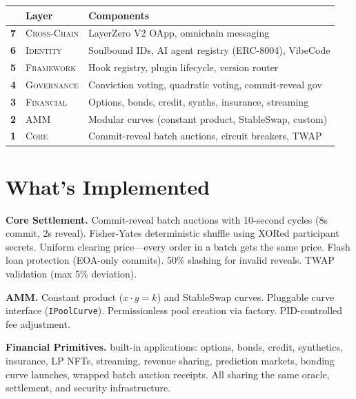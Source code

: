 \documentclass[10pt, letterpaper]{article}
\newcommand{\sub}[1]{\textbf{#1}\enspace}
\begin{document}
\vspace{0.2em}
\begin{center}
\small
\renewcommand{\arraystretch}{1.15}
\begin{tabular}{@{} c @{\;\;} l @{\;\;} l @{}}
\toprule
& \textbf{Layer} & \textbf{Components} \\
\midrule
\textsf{\textbf{7}} & \textsc{Cross-Chain} & LayerZero V2 OApp, omnichain messaging \\
\textsf{\textbf{6}} & \textsc{Identity} & Soulbound IDs, AI agent registry (ERC-8004), VibeCode \\
\textsf{\textbf{5}} & \textsc{Framework} & Hook registry, plugin lifecycle, version router \\
\textsf{\textbf{4}} & \textsc{Governance} & Conviction voting, quadratic voting, commit-reveal gov \\
\textsf{\textbf{3}} & \textsc{Financial} & Options, bonds, credit, synths, insurance, streaming \\
\textsf{\textbf{2}} & \textsc{AMM} & Modular curves (constant product, StableSwap, custom) \\
\textsf{\textbf{1}} & \textsc{Core} & Commit-reveal batch auctions, circuit breakers, TWAP \\
\bottomrule
\end{tabular}
\end{center}


\section{What's Implemented}

\sub{Core Settlement.} Commit-reveal batch auctions with 10-second cycles (8s commit, 2s reveal). Fisher-Yates deterministic shuffle using XORed participant secrets. Uniform clearing price---every order in a batch gets the same price. Flash loan protection (EOA-only commits). 50\% slashing for invalid reveals. TWAP validation (max 5\% deviation).

\sub{AMM.} Constant product ($x \cdot y = k$) and StableSwap curves. Pluggable curve interface (\texttt{IPoolCurve}). Permissionless pool creation via factory. PID-controlled fee adjustment.

\sub{Financial Primitives.} 11 built-in applications: options, bonds, credit, synthetics, insurance, LP NFTs, streaming, revenue sharing, prediction markets, bonding curve launches, wrapped batch auction receipts. All sharing the same oracle, settlement, and security infrastructure.
\end{document}
